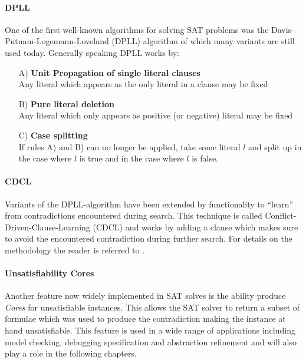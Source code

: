 \paragraph{DPLL} One of the first well-known algorithms for solving SAT problems was the Davis\hyp{}Putnam\hyp{}Logemann\hyp{}Loveland (DPLL) algorithm \cite{DPLL} of which many variants are still used today.
Generally speaking DPLL works by:
\begin{itemize}
    \item[A)]   \textbf{Unit Propagation of single literal clauses}\\
                Any literal which appears as the only literal in a clause may be fixed
    \item[B)]   \textbf{Pure literal deletion}\\
                Any literal which only appears as positive (or negative) literal may be fixed
    \item[C)]   \textbf{Case splitting}\\
                If rules A) and B) can no longer be applied, take some literal $l$ and split up in the case where $l$ is true and in the case where $l$ is false.
\end{itemize}

\paragraph{CDCL} Variants of the DPLL-algorithm have been extended by functionality to \enquote{learn} from contradictions encountered during search. This technique is called Conflict\hyp{}Driven\hyp{}Clause\hyp{}Learning (CDCL) and works by adding a clause which makes sure to avoid the encountered contradiction during further search. For details on the methodology the reader is referred to \cite{Grasp}.

\paragraph{Unsatisfiability Cores}
Another feature now widely implemented in SAT solves is the ability produce \textit{Cores} for unsatisfiable instances. This allows the SAT solver to return a subset of formulae which was used to  produce the contradiction making the instance at hand unsatisfiable. This feature is used in a wide range of applications including model checking, debugging specification and abstraction refinement \cite{Marques-Silva-PropositionalSATSolving} and will also play a role in the following chapters.

